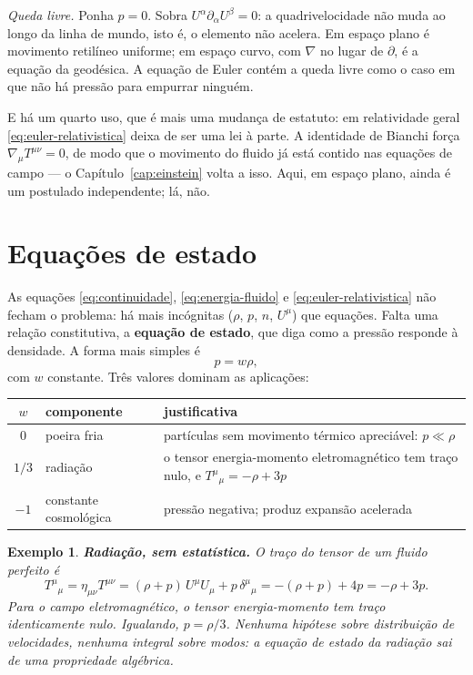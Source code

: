 \documentclass[12pt,a4paper,oneside]{book}
\theoremstyle{rgplain}
\newtheorem{example}{Exemplo}[chapter]
\theoremstyle{rgremark}
\begin{document}
\emph{Queda livre.} Ponha $p=0$. Sobra $U^\alpha\partial_\alpha U^\beta=0$: a
quadrivelocidade não muda ao longo da linha de mundo, isto é, o elemento não
acelera. Em espaço plano é movimento retilíneo uniforme; em espaço curvo, com
$\nabla$ no lugar de $\partial$, é a equação da geodésica. A equação de Euler
contém a queda livre como o caso em que não há pressão para empurrar ninguém.

E há um quarto uso, que é mais uma mudança de estatuto: em relatividade geral
\eqref{eq:euler-relativistica} deixa de ser uma lei à parte. A identidade de
Bianchi força $\nabla_\mu T^{\mu\nu}=0$, de modo que o movimento do fluido já
está contido nas equações de campo --- o Capítulo~\ref{cap:einstein} volta a
isso. Aqui, em espaço plano, ainda é um postulado independente; lá, não.

\section{Equações de estado}
\label{sec:eq-estado}
\label{sec:equacoes-estado}

As equações \eqref{eq:continuidade}, \eqref{eq:energia-fluido} e
\eqref{eq:euler-relativistica} não fecham o problema: há mais incógnitas
($\rho$, $p$, $n$, $U^\mu$) que equações. Falta uma relação constitutiva, a
\textbf{equação de estado}, que diga como a pressão responde à densidade. A
forma mais simples é
\begin{equation}
  p=w\rho ,
  \label{eq:eq-estado}
\end{equation}
com $w$ constante. Três valores dominam as aplicações:

\begin{center}
\small
\begin{tabular}{clp{6.6cm}}
\toprule
$w$ & componente & justificativa \\
\midrule
$0$ & poeira fria & partículas sem movimento térmico apreciável: $p\ll\rho$ \\
$1/3$ & radiação & o tensor energia-momento eletromagnético tem traço nulo, e
$T^\mu{}_\mu=-\rho+3p$ \\
$-1$ & constante cosmológica & pressão negativa; produz expansão acelerada \\
\bottomrule
\end{tabular}
\end{center}

\begin{example}
\textbf{Radiação, sem estatística.} O traço do tensor de um fluido perfeito é
\[
  T^\mu{}_\mu=\eta_{\mu\nu}T^{\mu\nu}
  =(\rho+p)\,U^\mu U_\mu+p\,\delta^\mu{}_\mu=-(\rho+p)+4p=-\rho+3p .
\]
Para o campo eletromagnético, o tensor energia-momento tem traço
identicamente nulo. Igualando, $p=\rho/3$. Nenhuma hipótese sobre
distribuição de velocidades, nenhuma integral sobre modos: a equação de
estado da radiação sai de uma propriedade algébrica.
\end{example}
\end{document}
